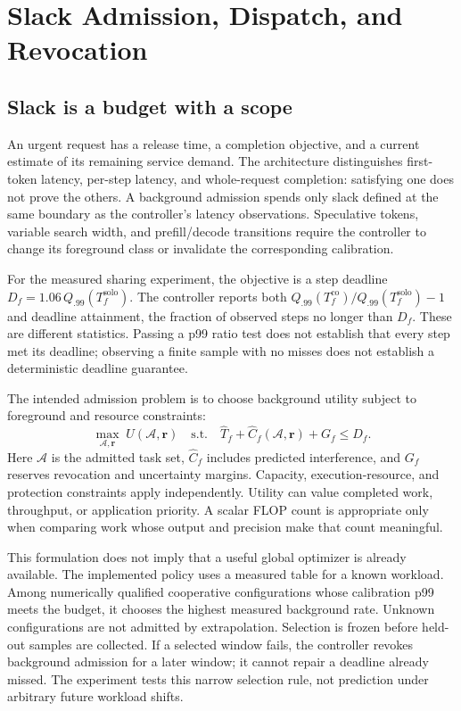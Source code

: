 \section{Slack Admission, Dispatch, and Revocation}
\label{sec:control}
\subsection{Slack is a budget with a scope}
An urgent request has a release time, a completion objective, and a current
estimate of its remaining service demand. The architecture distinguishes
first-token latency, per-step latency, and whole-request completion: satisfying
one does not prove the others. A background admission spends only slack
defined at the same boundary as the controller's latency observations.
Speculative tokens, variable search width, and prefill/decode transitions
require the controller to change its foreground class or invalidate the
corresponding calibration.

For the measured sharing experiment, the objective is a step deadline
$D_f=1.06\,Q_{.99}(T_f^{\mathrm{solo}})$. The controller reports both
$Q_{.99}(T_f^{\mathrm{co}})/Q_{.99}(T_f^{\mathrm{solo}})-1$ and deadline
attainment, the fraction of observed steps no longer than $D_f$. These are
different statistics. Passing a p99 ratio test does not establish that every
step met its deadline; observing a finite sample with no misses does not
establish a deterministic deadline guarantee.

The intended admission problem is to choose background utility subject to
foreground and resource constraints:
\begin{equation}
 \max_{\mathcal A,\mathbf r}\; U(\mathcal A,\mathbf r)
 \quad\text{s.t.}\quad
 \widehat T_f+\widehat C_f(\mathcal A,\mathbf r)+G_f\leq D_f.
\end{equation}
Here $\mathcal A$ is the admitted task set, $\widehat C_f$ includes predicted
interference, and $G_f$ reserves revocation and uncertainty margins. Capacity,
execution-resource, and protection constraints apply independently. Utility
can value completed work, throughput, or application priority. A scalar
FLOP count is appropriate only when comparing work whose output and precision
make that count meaningful.

This formulation does not imply that a useful global optimizer is already
available. The implemented policy uses a measured table for a known workload.
Among numerically qualified cooperative configurations whose calibration
p99 meets the budget, it chooses the highest measured background rate.
Unknown configurations are not admitted by extrapolation. Selection is
frozen before held-out samples are collected. If a selected window fails,
the controller revokes background admission for a later window; it cannot
repair a deadline already missed. The experiment tests this narrow selection
rule, not prediction under arbitrary future workload shifts.

